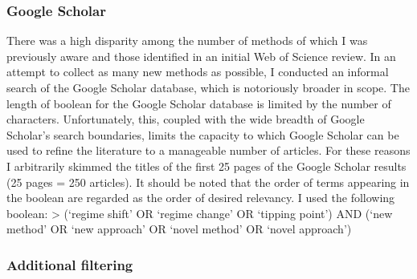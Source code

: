 \documentclass[12pt,twoside,openany]{reedthesis}
\begin{document}
\hypertarget{google-scholar}{%
\subsubsection{Google Scholar}\label{google-scholar}}

There was a high disparity among the number of methods of which I was previously aware and those identified in an initial Web of Science review. In an attempt to collect as many new methods as possible, I conducted an informal search of the Google Scholar database, which is notoriously broader in scope. The length of boolean for the Google Scholar database is limited by the number of characters. Unfortunately, this, coupled with the wide breadth of Google Scholar's search boundaries, limits the capacity to which Google Scholar can be used to refine the literature to a manageable number of articles. For these reasons I arbitrarily skimmed the titles of the first 25 pages of the Google Scholar results (25 pages = 250 articles). It should be noted that the order of terms appearing in the boolean are regarded as the order of desired relevancy. I used the following boolean:
\textgreater{} (`regime shift' OR `regime change' OR `tipping point') AND (`new method' OR `new approach' OR `novel method' OR `novel approach')

\hypertarget{additional-filtering}{%
\subsubsection{Additional filtering}\label{additional-filtering}}
\end{document}
